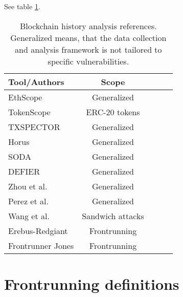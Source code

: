 \documentclass[draft,final]{vutinfth} %
\begin{document}
See table \ref{tab:blockchain_history_analyzers}.


\begin{table}[h]
    \begin{center}
        \begin{tabular}{ | l | c  | c | c | c | }
            \hline
            Tool/Authors & Scope \\ \hline
            EthScope \cite{wu_time-travel_2022} & Generalized \\ \hline
            TokenScope \cite{chen_tokenscope_2019} & ERC-20 tokens \\ \hline
            TXSPECTOR \cite{zhang_txspector_2020} & Generalized \\ \hline
            Horus \cite{ferreira_torres_eye_2021} & Generalized \\ \hline
            SODA \cite{chen_soda_2020} &  Generalized \\ \hline
            DEFIER \cite{su_evil_2021} & Generalized \\ \hline
            Zhou et al. \cite{zhou_ever-evolving_2020} & Generalized \\ \hline
            Perez et al. \cite{perez_smart_2021} & Generalized \\ \hline
            Wang et al. \cite{wang_impact_2022} & Sandwich attacks \\ \hline
            Erebus-Redgiant \cite{zhang_combatting_2023} & Frontrunning \\ \hline
            Frontrunner Jones \cite{torres_frontrunner_2021} & Frontrunning \\ \hline
        \end{tabular}
        \caption{Blockchain history analysis references. Generalized means, that the data collection and analysis framework is not tailored to specific vulnerabilities.}
        \label{tab:blockchain_history_analyzers}
    \end{center}
\end{table}

\chapter{Frontrunning definitions}

\end{document}
